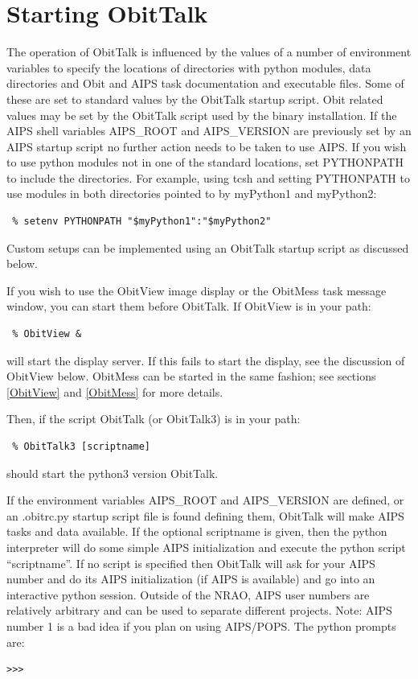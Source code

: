 \documentclass[11pt]{report}
\begin{document}
\section {Starting ObitTalk}
The operation of ObitTalk is influenced by the values of a number of
environment variables to specify the locations of directories with
python modules, data directories and Obit and AIPS task documentation
and executable files.
Some of these are set to standard values by the ObitTalk startup script.
Obit related values may be set by the ObitTalk script used by the
binary installation.
If the AIPS shell variables AIPS\_ROOT and AIPS\_VERSION are
previously set by an AIPS startup script no further action needs to be
taken to use AIPS.
If you wish to use python modules not in one of the standard locations,
set PYTHONPATH to include the directories.
For example, using tcsh and setting PYTHONPATH to use modules in both
directories pointed to by myPython1 and myPython2:
\begin{verbatim}
 % setenv PYTHONPATH "$myPython1":"$myPython2"
\end{verbatim}
Custom setups can be implemented using an ObitTalk startup script as
discussed below.

If you wish to use the ObitView image display or the ObitMess task
message window, you can start them before ObitTalk.
If ObitView is in your path:
\begin{verbatim}
 % ObitView &
\end{verbatim}
will start the display server.
If this fails to start the display, see the discussion of ObitView
below.
ObitMess can be started in the same fashion; see sections \ref{ObitView} and
\ref{ObitMess} for more details.

Then, if the script ObitTalk (or ObitTalk3) is in your path:
\begin{verbatim}
 % ObitTalk3 [scriptname]
\end{verbatim}
should start the python3 version ObitTalk.

If the environment variables AIPS\_ROOT and AIPS\_VERSION are
defined, or an .obitrc.py startup script file is found defining them,
ObitTalk will make AIPS tasks and data available. 
If the optional scriptname is given, then the python interpreter will
do some simple AIPS initialization and execute the python script
``scriptname''. 
If no script is specified then ObitTalk will ask for your AIPS number
and do its AIPS initialization (if AIPS is available) and go into an
interactive python session.
Outside of the NRAO, AIPS user numbers are relatively arbitrary and
can be used to separate different projects.
Note: AIPS number 1 is a bad idea if you plan on using AIPS/POPS.
The python prompts are: \begin{verbatim}>>> \end{verbatim}
\end{document}
